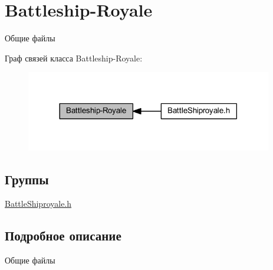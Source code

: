 \hypertarget{group__battleship-royale}{}\section{Battleship-\/\+Royale}
\label{group__battleship-royale}


Общие файлы  


Граф связей класса Battleship-\/\+Royale\+:
\nopagebreak
\begin{figure}[H]
\begin{center}
\leavevmode
\includegraphics[width=305pt]{group__battleship-royale}
\end{center}
\end{figure}
\subsection*{Группы}
\begin{DoxyCompactItemize}
\item 
\mbox{\hyperlink{group__battleshiproyale}{Battle\+Shiproyale.\+h}}
\end{DoxyCompactItemize}


\subsection{Подробное описание}
Общие файлы 

